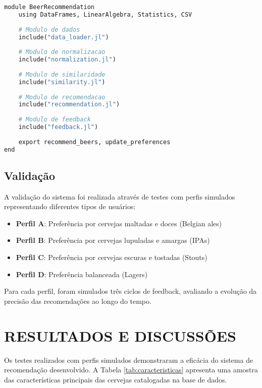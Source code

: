 \documentclass[12pt,a4paper]{article}
\begin{document}
\begin{lstlisting}[language=Python, caption=Estrutura modular do código Julia]
module BeerRecommendation
    using DataFrames, LinearAlgebra, Statistics, CSV
    
    # Modulo de dados
    include("data_loader.jl")
    
    # Modulo de normalizacao
    include("normalization.jl")
    
    # Modulo de similaridade
    include("similarity.jl")
    
    # Modulo de recomendacao
    include("recommendation.jl")
    
    # Modulo de feedback
    include("feedback.jl")
    
    export recommend_beers, update_preferences
end
\end{lstlisting}

\subsection{Validação}

A validação do sistema foi realizada através de testes com perfis simulados representando diferentes tipos de usuários:

\begin{itemize}
\item \textbf{Perfil A}: Preferência por cervejas maltadas e doces (Belgian ales)
\item \textbf{Perfil B}: Preferência por cervejas lupuladas e amargas (IPAs)
\item \textbf{Perfil C}: Preferência por cervejas escuras e tostadas (Stouts)
\item \textbf{Perfil D}: Preferência balanceada (Lagers)
\end{itemize}

Para cada perfil, foram simulados três ciclos de feedback, avaliando a evolução da precisão das recomendações ao longo do tempo.

\newpage
\section{RESULTADOS E DISCUSSÕES}

Os testes realizados com perfis simulados demonstraram a eficácia do sistema de recomendação desenvolvido. A Tabela \ref{tab:caracteristicas} apresenta uma amostra das características principais das cervejas catalogadas na base de dados.
\end{document}
